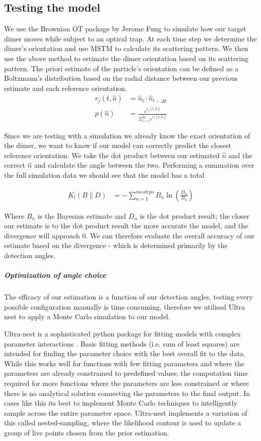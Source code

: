 \documentclass[11pt]{article}
\begin{document}
	\subsection*{Testing the model}
	We use the Brownian OT package by Jerome Fung \cite{Brownian_OT} to simulate how our target dimer moves while subject to an optical trap. At each time step we determine the dimer's orientation and use MSTM to calculate its scattering pattern. We then use the above method to estimate the dimer orientation based on its scattering pattern. The priori estimate of the particle's orientation can be defined as a Boltzmann's distribution based on the radial distance between our previous estimate and each reference orientation. 
	\begin{align}
		r_j(t, \hat{n})&= \hat{n}_{t} \cdot \hat{n}_{t-\Delta t} \\
		p(\hat{n})&= \frac{e^{r_j(t,\hat{n})}}
		{\Sigma_{i=1}^{24}e^{r_i(t, \hat{n})}}
	\end{align}
	
	Since we are testing with a simulation we already know the exact orientation of the dimer, we want to know if our model can correctly predict the closest reference orientation. We take the dot product between our estimated $\hat{n}$ and the correct $\hat{n}$ and calculate the angle between the two. Performing a summation over the full simulation data we should see that the model has a total 
	 
	\begin{align}
		K_l(B \parallel D) &= - \sum_{n=1}^{no. steps} B_n \ln(\frac{D_n}{B_n})
	\end{align}

	Where $B_n$ is the Bayesian estimate and $D_n$ is the dot product result; the closer our estimate is to the dot product result the more accurate the model, and the divergence will approach 0. We can therefore evaluate the overall accuracy of our estimate based on the divergence - which is determined primarily by the detection angles. 
	
	\subparagraph*{Optimization of angle choice}
	The efficacy of our estimation is a function of our detection angles, testing every possible configuration manually is time consuming, therefore we utilised Ultra nest to apply a Monte Carlo simulation to our model. 
	
	Ultra-nest is a sophisticated python package for fitting models with complex parameter interactions \cite{Ultranest}. Basic fitting methods (i.e. sum of least squares) are intended for finding the parameter choice with the best overall fit to the data. While this works well for functions with few fitting parameters and where the parameters are already constrained to predefined values; the computation time required for more functions where the parameters are less constrained or where there is no analytical solution connecting the parameters to the final output. In cases like this its best to implement Monte Carlo techniques to intelligently sample across the entire parameter space. Ultra-nest implements a variation of this called nested-sampling, where the likelihood contour is used to update a group of live points chosen from the prior estimation.
	
\end{document}
